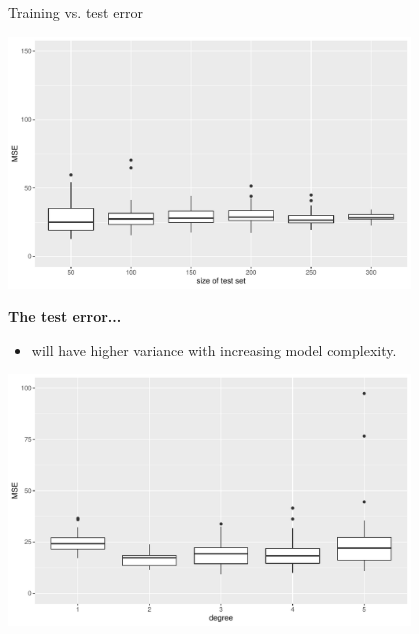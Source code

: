 \begin{vbframe}{Training vs. test error}
\begin{itemize}
\end{itemize}
\begin{center}
\includegraphics[width=0.8\textwidth]{figure/fig-train-vs-test-error-3}
\end{center}  

\framebreak
\textbf{The test error...}

\begin{itemize}    
  
  \item will have higher variance with increasing model complexity.
\end{itemize}

\begin{center}
\includegraphics[width=0.8\textwidth]{figure/fig-train-vs-test-error-5}
\end{center} 

\end{vbframe}



